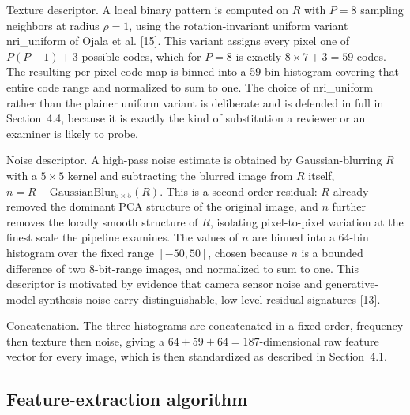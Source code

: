 \documentclass[11pt]{article}
\begin{document}
Texture descriptor. A local binary pattern is computed on $R$ with $P=8$ sampling neighbors at radius $\rho=1$, using the rotation-invariant uniform variant nri\_uniform of Ojala et al. [15]. This variant assigns every pixel one of $P(P-1)+3$ possible codes, which for $P=8$ is exactly $8 \times 7 + 3 = 59$ codes. The resulting per-pixel code map is binned into a 59-bin histogram covering that entire code range and normalized to sum to one. The choice of nri\_uniform rather than the plainer uniform variant is deliberate and is defended in full in Section~4.4, because it is exactly the kind of substitution a reviewer or an examiner is likely to probe.

Noise descriptor. A high-pass noise estimate is obtained by Gaussian-blurring $R$ with a $5\times5$ kernel and subtracting the blurred image from $R$ itself, $n = R - \mathrm{GaussianBlur}_{5\times5}(R)$. This is a second-order residual: $R$ already removed the dominant PCA structure of the original image, and $n$ further removes the locally smooth structure of $R$, isolating pixel-to-pixel variation at the finest scale the pipeline examines. The values of $n$ are binned into a 64-bin histogram over the fixed range $[-50, 50]$, chosen because $n$ is a bounded difference of two 8-bit-range images, and normalized to sum to one. This descriptor is motivated by evidence that camera sensor noise and generative-model synthesis noise carry distinguishable, low-level residual signatures [13].

Concatenation. The three histograms are concatenated in a fixed order, frequency then texture then noise, giving a $64 + 59 + 64 = 187$-dimensional raw feature vector for every image, which is then standardized as described in Section~4.1.

\subsection{Feature-extraction algorithm}
\end{document}
